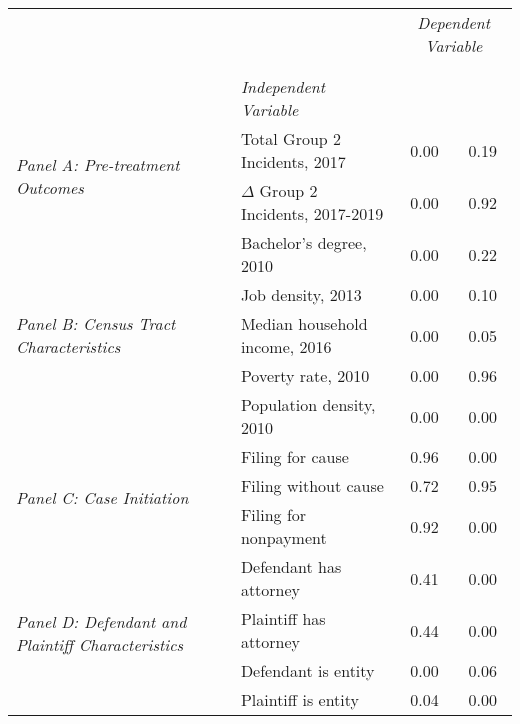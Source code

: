 \begin{tabular}{llcc}
\toprule
 &  & \multicolumn{2}{c}{\textit{Dependent Variable}} \\
\cline{3-4}
\\
 &  &  &  \\
 & \emph{Independent Variable} &  &  \\
\midrule
\multirow[c]{2}{3cm}{\textit{Panel A: Pre-treatment Outcomes}} & Total Group 2 Incidents, 2017 & 0.00 & 0.19 \\
 & $\Delta$ Group 2 Incidents, 2017-2019 & 0.00 & 0.92 \\
\cline{1-4}
\multirow[c]{5}{3cm}{\textit{Panel B: Census Tract Characteristics}} & Bachelor's degree, 2010 & 0.00 & 0.22 \\
 & Job density, 2013 & 0.00 & 0.10 \\
 & Median household income, 2016 & 0.00 & 0.05 \\
 & Poverty rate, 2010 & 0.00 & 0.96 \\
 & Population density, 2010 & 0.00 & 0.00 \\
\cline{1-4}
\multirow[c]{3}{3cm}{\textit{Panel C: Case Initiation}} & Filing for cause & 0.96 & 0.00 \\
 & Filing without cause & 0.72 & 0.95 \\
 & Filing for nonpayment & 0.92 & 0.00 \\
\cline{1-4}
\multirow[c]{4}{3cm}{\textit{Panel D: Defendant and Plaintiff Characteristics}} & Defendant has attorney & 0.41 & 0.00 \\
 & Plaintiff has attorney & 0.44 & 0.00 \\
 & Defendant is entity & 0.00 & 0.06 \\
 & Plaintiff is entity & 0.04 & 0.00 \\
\cline{1-4}
\bottomrule
\end{tabular}
